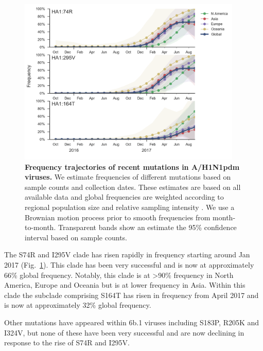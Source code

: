 \documentclass[11pt,oneside,letterpaper]{article}
\newcommand{\FIG}[1]{Fig.~\ref{#1}}
\begin{document}
\begin{figure}[H]
  \centering
  \includegraphics[width=0.95\textwidth]{../figures/sep-2017/h1n1pdm_mutations.png}
  \caption{\textbf{Frequency trajectories of recent mutations in A/H1N1pdm viruses.}
  We estimate frequencies of different mutations based on sample counts and collection dates.
  These estimates are based on all available data and global frequencies are weighted according to regional population size and relative sampling intensity .
  We use a Brownian motion process prior to smooth frequencies from month-to-month.
  Transparent bands show an estimate the 95\% confidence interval based on sample counts.
  }
  \label{h1n1pdm_mutations}
\end{figure}

The S74R and I295V clade has risen rapidly in frequency starting around Jan 2017 (\FIG{h1n1pdm_mutations}).
This clade has been very successful and is now at approximately 66\% global frequency.
Notably, this clade is at \textgreater{}90\% frequency in North America, Europe and Oceania but is at lower frequency in Asia.
Within this clade the subclade comprising S164T has risen in frequency from April 2017 and is now at approximately 32\% global frequency.

Other mutations have appeared within 6b.1 viruses including S183P, R205K
and I324V, but none of these have been very successful and are now
declining in response to the rise of S74R and I295V.
\end{document}

